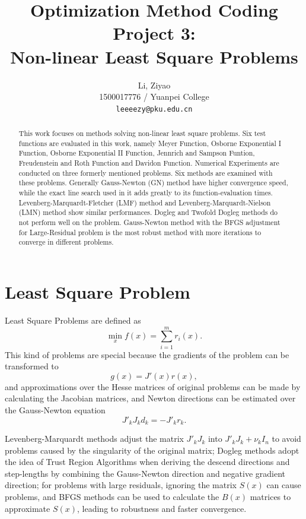 \documentclass[11pt,a4paper]{article}
\title{Optimization Method Coding Project 3: \\ Non-linear Least Square Problems}
\author{Li, Ziyao \\
  1500017776 / Yuanpei College \\
  {\tt leeeezy@pku.edu.cn}
  }
\date{}
\begin{document}
\maketitle
\begin{abstract}
  This work focuses on methods solving non-linear least square problems. Six test functions are evaluated in this work, namely Meyer Function, Osborne Exponential I Function, Osborne Exponential II Function, Jennrich and Sampson Funtion, Freudenstein and Roth Function and Davidon Function. Numerical Experiments are conducted on three formerly mentioned problems. Six methods are examined with these problems. Generally Gauss-Newton (GN) method have higher convergence speed, while the exact line search used in it adds greatly to its function-evaluation times. Levenberg-Marquardt-Fletcher (LMF) method and Levenberg-Marquardt-Nielson (LMN) method show similar performances. Dogleg and Twofold Dogleg methods do not perform well on the problem. Gauss-Newton method with the BFGS adjustment for Large-Residual problem is the most robust method with more iterations to converge in different problems.
\end{abstract}

\section{Least Square Problem}

Least Square Problems are defined as
\begin{displaymath}
  \min_x f(x) = \sum_{i=1}^{m}r_i(x).
\end{displaymath}
This kind of problems are special because the gradients of the problem can be transformed to
\begin{displaymath}
  g(x) = J'(x)r(x),
\end{displaymath}
and approximations over the Hesse matrices of original problems can be made by calculating the Jacobian matrices, and Newton directions can be estimated over the Gauss-Newton equation
\begin{displaymath}
  J'_k J_k d_k = -J'_k r_k.
\end{displaymath}

Levenberg-Marquardt methods adjust the matrix $J'_k J_k$ into $J'_k J_k + \nu_k I_n$ to avoid problems caused by the singularity of the original matrix; Dogleg methods adopt the idea of Trust Region Algorithms when deriving the descend directions and step-lengths by combining the Gauss-Newton direction and negative gradient direction; for problems with large residuals, ignoring the matrix $S(x)$ can cause problems, and BFGS methods can be used to calculate the $B(x)$ matrices to approximate $S(x)$, leading to robustness and faster convergence.
\end{document}
